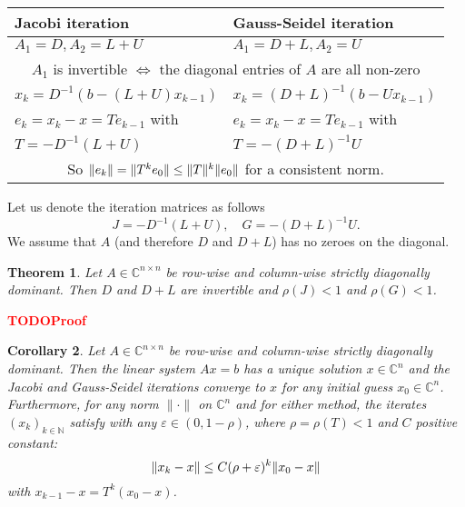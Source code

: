 \documentclass[12pt]{article}
\newcounter{lecture}
\newtheorem{theorem}{Theorem}[lecture]
\newtheorem{corollary}[theorem]{Corollary}
\theoremstyle{definition}
\theoremstyle{remark}
\numberwithin{equation}{section}
\newcommand{\C}{\mathbb{C}}
\newcommand{\N}{\mathbb{N}}
\newcommand{\normempty}{\|\cdot\|}
\newcommand{\TODO}[1][]{\textcolor{red}{\textbf{TODO\ifblank{#1}{}{:\ }#1} }}
\DeclarePairedDelimiter{\norm}{\lVert}{\rVert}
\begin{document}
\begin{center}
  \bgroup
  \def\arraystretch{2}%
  \begin{tabular}{l | l}
    Jacobi iteration & Gauss-Seidel iteration \\
    \hline
    $A_1=D, A_2=L+U$ & $A_1=D+L, A_2=U$ \\
    \hline
    \multicolumn{2}{c}{$A_1$ is invertible $\Leftrightarrow$ the diagonal entries of $A$ are all non-zero} \\
    \hline
    $x_k = D^{-1}(b - (L+U)x_{k-1})$ & $x_k = (D+L)^{-1}(b - Ux_{k-1})$ \\
    $e_k = x_k - x = T e_{k-1}$ with & $e_k = x_k - x = T e_{k-1}$ with \\
    $T = -D^{-1}(L+U)$ & $T = -(D+L)^{-1}U$ \\
    \hline
    \multicolumn{2}{c}{So $\norm{e_k} = \norm{T^k e_0} \leq \norm{T}^k \norm{e_0}$ for a consistent norm.}
  \end{tabular}
  \egroup
\end{center}

Let us denote the iteration matrices as follows
\begin{equation*}
  J = -D^{-1}(L+U),\quad G = -(D+L)^{-1}U.
\end{equation*}
We assume that $A$ (and therefore $D$ and $D+L$) has no zeroes on the diagonal.


\begin{theorem}
  Let $A \in \C^{n\times n}$ be row-wise and column-wise strictly diagonally dominant. Then $D$ and $D+L$ are invertible and $\rho(J) < 1$ and $\rho(G) < 1$.
\end{theorem}
\TODO[Proof]

\begin{corollary}
  Let $A \in \C^{n\times n}$ be row-wise and column-wise strictly diagonally dominant. Then the linear system $Ax = b$ has a unique solution $x \in \C^n$ and the Jacobi and Gauss-Seidel iterations converge to $x$ for any initial guess $x_0 \in \C^n$. Furthermore, for any norm $\normempty$ on $\C^n$ and for either method, the iterates $(x_k)_{k \in \N}$ satisfy with any $\varepsilon \in (0, 1-\rho)$, where $\rho = \rho(T) < 1$ and $C$ positive constant:
  \begin{equation*}
    \norm{x_k - x} \leq C (\rho + \varepsilon)^k \norm{x_0 - x}
  \end{equation*}
  with $x_{k-1} - x = T^k (x_0 - x)$.
\end{corollary}
\end{document}
